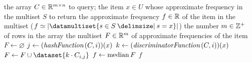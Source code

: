 \begin{algorithmic}[1]
  \In the array \( C \in \mathbb{R}^{m \times n} \) to query; the item \( x \in U \) whose approximate frequency in the multiset \( S \) to return
  \Out the approximate frequency \( f \in \mathbb{R} \) of the item in the multiset (\( f \simeq \cardinality{\datamultiset{s \in S \suchthat s = x}} \))
  \Constant the number \( m \in \mathbb{Z}^{+} \) of rows in the array
  \Local the multiset \( F \in \mathbb{R}^{m} \) of approximate frequencies of the item
    \State \( F \gets \varnothing \)
      \State \( j \gets (\hashFunction (C, i))(x) \)
      \State \( k \gets (\discriminatorFunction (C, i))(x) \)
      \State \( F \gets F \cup \dataset{k \cdot C_{i, j}} \)
    \EndFor
    \State \( f \gets \operatorname*{median} F \)
    \State \Return \( f \)
  \EndFunction
\end{algorithmic}
